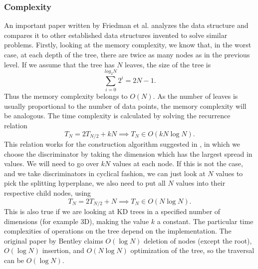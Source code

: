 \documentclass[12pt]{article}
\begin{document}
\subsubsection{Complexity}
An important paper written by Friedman et al. \cite{friedman1977algorithm} analyzes the data structure and compares it to other established data structures invented to solve similar problems. Firstly, looking at the memory complexity, we know that, in the worst case, at each depth of the tree, there are twice as many nodes as in the previous level. If we assume that the tree has $N$ leaves, the size of the tree is
\[
	\sum_{i=0}^{log_2 N}{2^i} = 2N - 1.
\]
Thus the memory complexity belongs to $O(N)$. As the number of leaves is usually proportional to the number of data points, the memory complexity will be analogous. The time complexity is calculated by solving the recurrence relation
\[
T_N = 2T_{N/2}+kN \implies T_N \in O(kN\log N).
\]
This relation works for the construction algorithm suggested in \cite{friedman1977algorithm}, in which we choose the discriminator by taking the dimension which has the largest spread in values. We will need to go over $kN$ values at each node. If this is not the case, and we take discriminators in cyclical fashion, we can just look at $N$ values to pick the splitting hyperplane, we also need to put all $N$ values into their respective child nodes, using
\[
T_N = 2T_{N/2}+N \implies T_N \in O(N\log N).
\]
This is also true if we are looking at KD trees in a specified number of dimensions (for example 3D), making the value $k$ a constant. The particular time complexities of operations on the tree depend on the implementation. The original paper by Bentley \cite{bentley1975multidimensional} claims $O(\log N)$ deletion of nodes (except the root), $O(\log N)$ insertion, and $O(N\log N)$ optimization of the tree, so the traversal can be $O(\log N)$.
\end{document}
